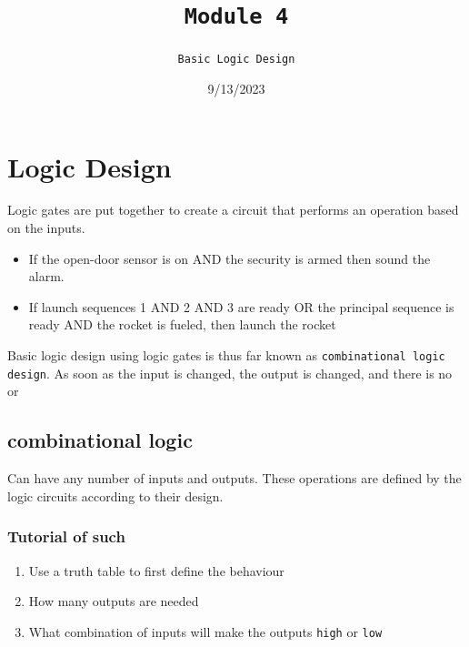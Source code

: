 \documentclass[a4paper,12pt]{article}
\title{\texttt{Module 4}\\\hrulefill}
\author{\texttt{Basic Logic Design}}
\date{\small{9/13/2023}}
\begin{document}
    \maketitle

    \section{Logic Design}
    Logic gates are put together to create a circuit that performs an operation based on the inputs.
        \begin{itemize}\vspace{3pt}
            \item If the open-door sensor is on AND the security is armed then sound the alarm.
            \item If launch sequences 1 AND 2 AND 3 are ready OR the principal sequence is ready AND the
            rocket is fueled, then launch the rocket
        \end{itemize}
    Basic logic design using logic gates is thus far known as \texttt{combinational logic design}. As soon as the input is changed, the output is changed, and there is no  or 

    \subsection*{combinational logic}
        Can have any number of inputs and outputs. These operations are defined by the logic circuits according to their design.

        \subsubsection*{Tutorial of such}
            \begin{enumerate}
                \item Use a truth table to first define the behaviour
                \item How many outputs are needed
                \item What combination of inputs will make the outputs \texttt{high} or \texttt{low}
            \end{enumerate}
\end{document}
